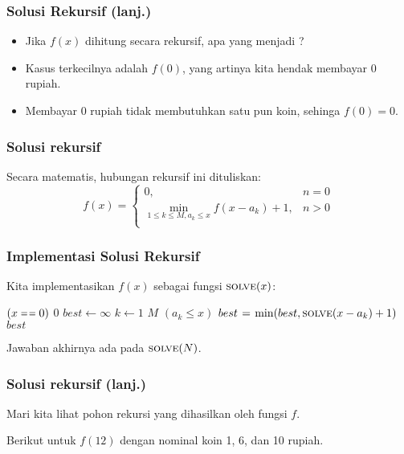 \begin{frame}
\frametitle{Solusi Rekursif (lanj.)}
\begin{itemize}
  \item Jika $f(x)$ dihitung secara rekursif, apa yang menjadi \fbasecase?
  \item Kasus terkecilnya adalah $f(0)$, yang artinya kita hendak membayar 0 rupiah.
  \item Membayar 0 rupiah tidak membutuhkan satu pun koin, sehinga $f(0) = 0$.
\end{itemize}
\end{frame}

\begin{frame}
\frametitle{Solusi rekursif}
Secara matematis, hubungan rekursif ini dituliskan:
\[f(x) = \left\{\begin{array}{lr}
    0, & n = 0\\
    \min_{1 \leq k \leq M, a_k \leq x} {f(x - a_k) + 1}, & n > 0\\
    \end{array}\right. \]
\end{frame}

\begin{frame}
\frametitle{Implementasi Solusi Rekursif}
Kita implementasikan $f(x)$ sebagai fungsi $\textnormal{\scshape solve}(x)$:
\begin{codebox}
\li \If $(x \isequal 0)$ \Then
\li   \Return $0$
\li \Else
\li   $best \gets \infty$
\li   \For $k \gets 1$ \To $M$ \Do
\li     \If $(a_k \leq x)$ \Then
\li       $best \mathrel{\hspace{1pt}=\hspace{1pt}} \min(best, \textnormal{\scshape solve}(x - a_k) + 1)$
        \End
      \End
\li   \Return $best$
    \End
\end{codebox}

Jawaban akhirnya ada pada $\textnormal{\scshape solve}(N)$.
\end{frame}

\begin{frame} [fragile]
\frametitle{Solusi rekursif (lanj.)}
Mari kita lihat pohon rekursi yang dihasilkan oleh fungsi $f$. 

Berikut untuk $f(12)$ dengan nominal koin 1, 6, dan 10 rupiah.

\begin{center}
\scalebox{0.9}{
\Tree [.$f(12)$
  [.$f(2)$
    [.$f(1)$
      [.$f(0)$ ]
    ]
  ]
  [.$f(6)$
    [.$f(0)$ ]
    [.$f(5)$
      [.$f(4)$
        [.$...$
        ]
      ]
    ]
  ]
  [.$f(11)$
    [.$f(1)$
      [.$f(0)$ ]
    ]
    [.$f(5)$
      [.$f(4)$
        [.$...$          
        ]
      ]
    ]
    [.$f(10)$ 
      [.$f(0)$ 
        [.$...$ ]      
      ]
      [.$f(4)$ 
        [.$...$ ]      
      ]
      [.$f(9)$ 
        [.$...$ ]      
      ]
    ]
  ]
]
}
\end{center}
\end{frame}

